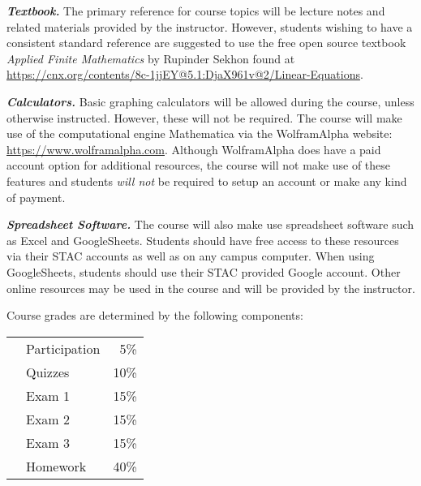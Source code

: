 \documentclass[11pt,letterpaper]{article}
\begin{document}
{\itshape\bfseries\color{stacred}Textbook.} The primary reference for course topics will be lecture notes and related materials provided by the instructor. However, students wishing to have a consistent standard reference are suggested to use the free open source textbook \textit{Applied Finite Mathematics} by Rupinder Sekhon found at \url{https://cnx.org/contents/8c-1jjEY@5.1:DjaX961v@2/Linear-Equations}. \pspace

{\itshape\bfseries\color{stacred}Calculators.} Basic graphing calculators will be allowed during the course, unless otherwise instructed. However, these will not be required. The course will make use of the computational engine Mathematica via the WolframAlpha website: \url{https://www.wolframalpha.com}. Although WolframAlpha does have a paid account option for additional resources, the course will not make use of these features and students {\itshape will not} be required to setup an account or make any kind of payment. \pspace

{\itshape\bfseries\color{stacred}Spreadsheet Software.} 
The course will also make use spreadsheet software such as Excel and GoogleSheets. Students should have free access to these resources via their STAC accounts as well as on any campus computer. When using GoogleSheets, students should use their STAC provided Google account. Other online resources may be used in the course and will be provided by the instructor. 
\sectionbreak









Course grades are determined by the following components: \par
	\begin{table}[!ht]
        \begin{tabular}{clr}
	& Participation & 5\% \\
	& Quizzes & 10\% \\
	& Exam 1 & 15\% \\
	& Exam 2 & 15\% \\
	& Exam 3 & 15\% \\
	& Homework & 40\% \\
        \end{tabular} 
        \end{table}
\sectionbreak
\end{document}
